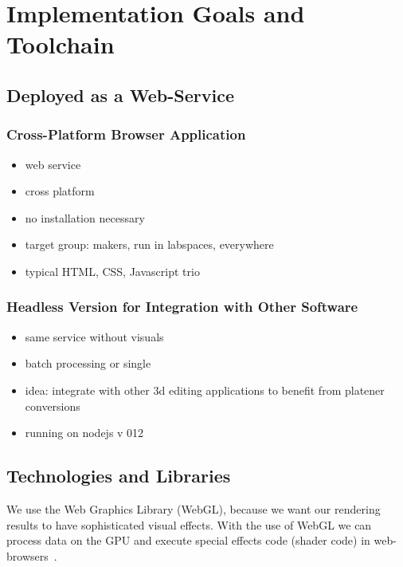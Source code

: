 \documentclass[../ClassicThesis.tex]{subfiles}
\begin{document}
\chapter{Implementation Goals and Toolchain}\label{ch:toolchain}

\newcommand\myNotes[1]{\textcolor{red}{#1}}

\section{Deployed as a Web-Service}

\subsection{Cross-Platform Browser Application}

\begin{itemize}
\item web service
\item cross platform
\item no installation necessary
\item target group: makers, run in labspaces, everywhere
\item typical HTML, CSS, Javascript trio
\end{itemize}

\subsection{Headless Version for Integration with Other Software}

\begin{itemize}
\item same service without visuals
\item batch processing or single
\item idea: integrate with other 3d editing applications to benefit
  from platener conversions
\item running on nodejs v 012
\end{itemize}

\section{Technologies and Libraries}



We use the Web Graphics Library (WebGL), because we want our
rendering results to have sophisticated visual effects. With
the use of WebGL we can process data on the GPU and execute
special effects code (shader code) in
web-browsers~\cite{mdn-webgl}.
\end{document}
